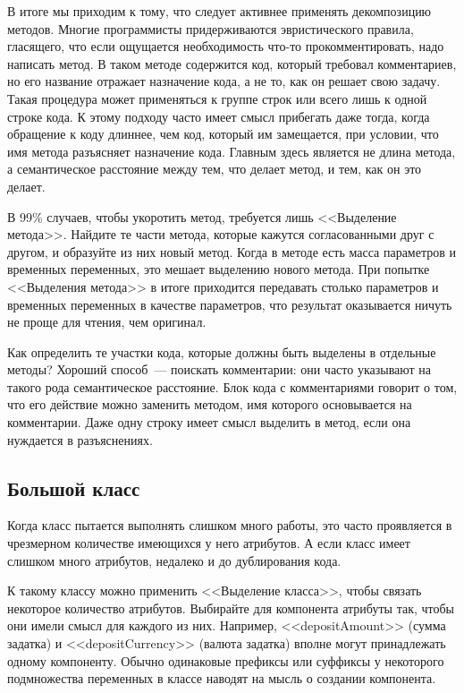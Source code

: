 \documentclass{../../text-style}
\begin{document}
В итоге мы приходим к тому, что следует активнее применять декомпозицию методов. Многие программисты придерживаются эвристического правила, гласящего, что если ощущается необходимость что-то прокомментировать, надо написать метод. В таком методе содержится код, который требовал комментариев, но его название отражает назначение кода, а не то, как он решает свою задачу. Такая процедура может применяться к группе строк или всего лишь к одной строке кода. К этому подходу часто имеет смысл прибегать даже тогда, когда обращение к коду длиннее, чем код, который им замещается, при условии, что имя метода разъясняет назначение кода. Главным здесь является не длина метода, а семантическое расстояние между тем, что делает метод, и тем, как он это делает.

В 99\% случаев, чтобы укоротить метод, требуется лишь <<Выделение метода>>. Найдите те части метода, которые кажутся согласованными друг с другом, и образуйте из них новый метод. Когда в методе есть масса параметров и временных переменных, это мешает выделению нового метода. При попытке <<Выделения метода>> в итоге приходится передавать столько параметров и временных переменных в качестве параметров, что результат оказывается ничуть не проще для чтения, чем оригинал.

Как определить те участки кода, которые должны быть выделены в отдельные методы? Хороший способ~--- поискать комментарии: они часто указывают на такого рода семантическое расстояние. Блок кода с комментариями говорит о том, что его действие можно заменить методом, имя которого основывается на комментарии. Даже одну строку имеет смысл выделить в метод, если она нуждается в разъяснениях.

\subsection{Большой класс}

Когда класс пытается выполнять слишком много работы, это часто проявляется в чрезмерном количестве имеющихся у него атрибутов. А если класс имеет слишком много атрибутов, недалеко и до дублирования кода.

К такому классу можно применить <<Выделение класса>>, чтобы связать некоторое количество атрибутов. Выбирайте для компонента атрибуты так, чтобы они имели смысл для каждого из них. Например, <<depositAmount>> (сумма задатка) и <<depositCurrency>> (валюта задатка) вполне могут принадлежать одному компоненту. Обычно одинаковые префиксы или суффиксы у некоторого подмножества переменных в классе наводят на мысль о создании компонента. 
\end{document}
